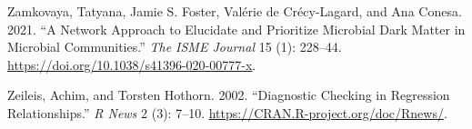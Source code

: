 \documentclass[
  a4paper,
]{article}
\newlength{\cslhangindent}
\newlength{\cslentryspacingunit} %
\newenvironment{CSLReferences}[2] %
 {%
  \setlength{\parindent}{0pt}
  \ifodd #1
  \let\oldpar\par
  \def\par{\hangindent=\cslhangindent\oldpar}
  \fi
  \setlength{\parskip}{#2\cslentryspacingunit}
 }%
 {}
\begin{document}
\begin{CSLReferences}{1}{0}
\leavevmode{}%
Zamkovaya, Tatyana, Jamie S. Foster, Valérie de Crécy-Lagard, and Ana
Conesa. 2021. {``A Network Approach to Elucidate and Prioritize
Microbial Dark Matter in Microbial Communities.''} \emph{The ISME
Journal} 15 (1): 228--44.
\url{https://doi.org/10.1038/s41396-020-00777-x}.

\leavevmode{}%
Zeileis, Achim, and Torsten Hothorn. 2002. {``Diagnostic Checking in
Regression Relationships.''} \emph{R News} 2 (3): 7--10.
\url{https://CRAN.R-project.org/doc/Rnews/}.

\end{CSLReferences}
\end{document}
